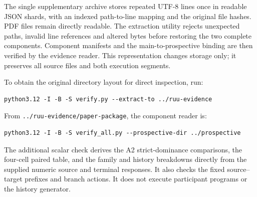 The single supplementary archive stores repeated UTF-8 lines once in readable
JSON shards, with an indexed path-to-line mapping and the original file
hashes. PDF files remain directly readable. The extraction utility rejects
unexpected paths, invalid line references and altered bytes before restoring
the two complete components. Component manifests and the main-to-prospective
binding are then verified by the evidence reader. This representation changes
storage only; it preserves all source files and both execution segments.
\noindent\begin{minipage}{\linewidth}
To obtain the original directory layout for direct inspection, run:
\begin{verbatim}
python3.12 -I -B -S verify.py --extract-to ../ruu-evidence
\end{verbatim}
\end{minipage}

\noindent\begin{minipage}{\linewidth}
From
\texttt{../ruu-evidence/paper-package}, the component reader is:
\begin{verbatim}
python3.12 -I -B -S verify_all.py --prospective-dir ../prospective
\end{verbatim}
\end{minipage}

The additional scalar check derives the A2 strict-dominance comparisons,
the four-cell paired table, and the family and history breakdowns directly
from the supplied numeric source and terminal responses. It also checks
the fixed source--target prefixes and branch actions. It does not execute
participant programs or the history generator.
